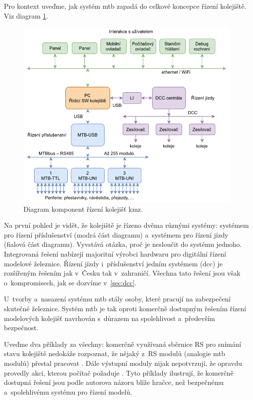 Pro kontext uveďme, jak systém \gls{mtb} zapadá do celkové koncepce řízení
kolejiště. Viz diagram \ref{fig:control-topology}.

\begin{figure}[ht]
\includegraphics[width=\textwidth]{data/railroad-diagram.pdf}
\caption{Diagram komponent řízení kolejišť \gls{kmz}.}
\label{fig:control-topology}
\end{figure}

Na první pohled je vidět, že kolejiště je řízeno dvěma různými systémy:
systémem pro řízení příslušenství (modrá část diagramu) a~systémem pro řízení
jízdy (fialová část diagramu). Vyvstává otázka, proč je nesloučit do systému
jednoho. Integrovaná řešení nabízejí majoritní výrobci hardwaru pro digitální
řízení modelové železnice. Řízení jízdy i~příslušenství jedním systémem (\gls{dcc})
je rozšířeným řešením jak v~Česku tak v~zahraničí. Všechna tato řešení jsou
však o~kompromisech, jak se dozvíme v~\ref{sec:dcc}.

U~tvorby a~nasazení systému \gls{mtb} stály osoby, které pracují na zabezpečení
skutečné železnice. Systém \gls{mtb} je tak oproti komerčně dostupným řešením
řízení modelových kolejišť navrhován s~důrazem na spolehlivost a~především
bezpečnost.

Uveďme dva příklady za všechny: komerčně využívaná sběrnice RS pro snímání
stavu kolejiště nedokáže rozpoznat, že nějaký z~RS modulů (analogie \gls{mtb}
modulů) přestal pracovat \cite{rs:web}. Dále výstupní moduly nijak nepotvrzují,
že opravdu provedly akci, kterou počítač požaduje \cite{dcc_specs:web}. Tyto
příklady ilustrují, že komerčně dostupná řešení jsou podle autorova názoru blíže
hračce, než bezpečnému a~spolehlivému systému pro řízení modelů.

